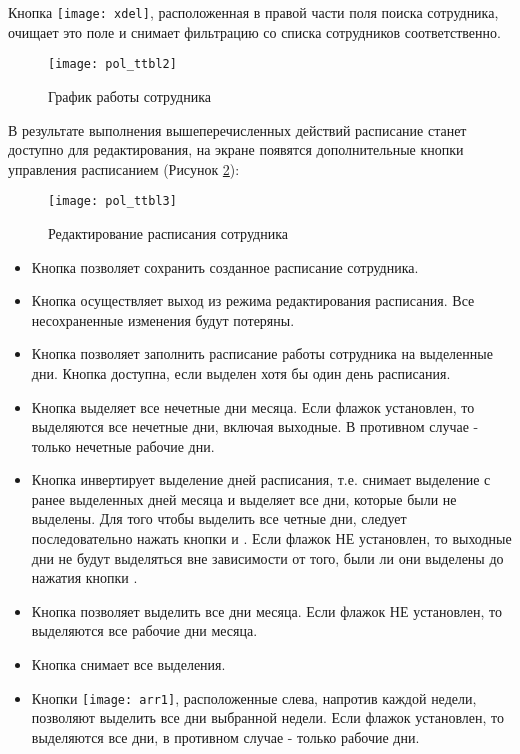 \begin{prim}
Кнопка \texttt{[image: xdel]}, расположенная в правой части поля поиска сотрудника, очищает это поле и снимает фильтрацию со списка сотрудников соответственно.
\end{prim}

\begin{figure}[ht]\centering
 \texttt{[image: pol\_ttbl2]}
 \caption{График работы сотрудника}
 \label{img_pol_ttbl2}
\end{figure}

В результате выполнения вышеперечисленных действий расписание станет доступно для редактирования, на экране появятся дополнительные кнопки управления расписанием (Рисунок \ref{img_pol_ttbl3}):

\begin{figure}[ht]\centering
 \texttt{[image: pol\_ttbl3]}
 \caption{Редактирование расписания сотрудника}
 \label{img_pol_ttbl3}
\end{figure}

\begin{itemize}
 \item Кнопка  позволяет сохранить созданное расписание сотрудника.
 \item Кнопка  осуществляет выход из режима редактирования расписания. Все несохраненные изменения будут потеряны.
 \item Кнопка  позволяет заполнить расписание работы сотрудника на выделенные дни. Кнопка доступна, если выделен хотя бы один день расписания.
 \item Кнопка  выделяет все нечетные дни месяца. Если флажок  установлен, то выделяются все нечетные дни, включая выходные. В противном случае - только нечетные рабочие дни.
 \item Кнопка  инвертирует выделение дней расписания, т.е. снимает выделение с ранее выделенных дней месяца и выделяет все дни, которые были не выделены. Для того чтобы выделить все четные дни, следует последовательно нажать кнопки  и . Если флажок  НЕ установлен, то выходные дни не будут выделяться вне зависимости от того, были ли они выделены до нажатия кнопки .
 \item Кнопка  позволяет выделить все дни месяца. Если флажок  НЕ установлен, то выделяются все рабочие дни месяца.
 \item Кнопка  снимает все выделения.
 \item Кнопки \texttt{[image: arr1]}, расположенные слева, напротив каждой недели,   позволяют выделить все дни выбранной недели. Если флажок  установлен, то выделяются все дни, в противном случае - только рабочие дни.
\end{itemize}


